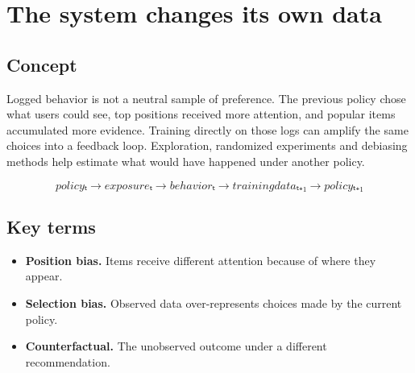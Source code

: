 \section{The system changes its own data}

\begin{abstract}
Recommendations create exposures; exposures create the next training set.
\end{abstract}

\subsection{Concept}
Logged behavior is not a neutral sample of preference. The previous policy chose what users could see, top positions received more attention, and popular items accumulated more evidence. Training directly on those logs can amplify the same choices into a feedback loop. Exploration, randomized experiments and debiasing methods help estimate what would have happened under another policy.

\begin{equation*}
policyₜ \rightarrow exposureₜ \rightarrow behaviorₜ \rightarrow training dataₜ₊₁ \rightarrow policyₜ₊₁
\end{equation*}

\subsection{Key terms}
\begin{itemize}
\item \textbf{Position bias.} Items receive different attention because of where they appear.
\item \textbf{Selection bias.} Observed data over-represents choices made by the current policy.
\item \textbf{Counterfactual.} The unobserved outcome under a different recommendation.
\end{itemize}
